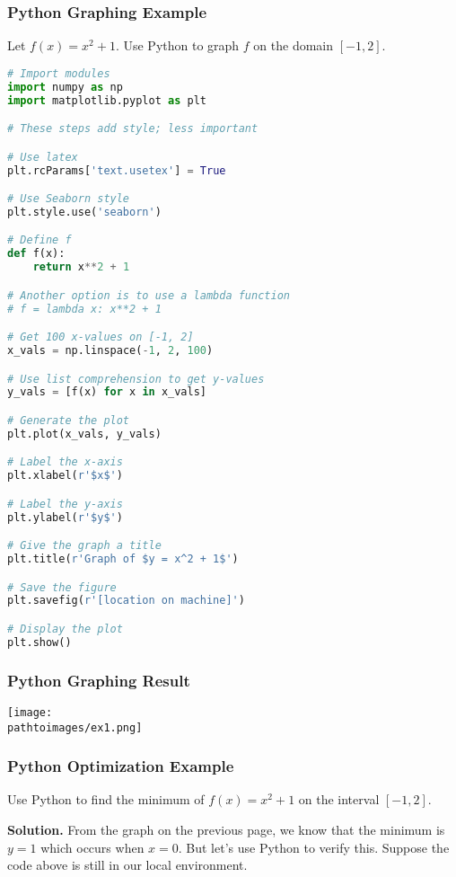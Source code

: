 \documentclass{beamer}
\newcommand{\pathtoimages}{/Users/charlesrambo/Desktop/Bootcamp24/Images}
\begin{document}
\begin{frame}[fragile]
\frametitle{Python Graphing Example}

\begin{example} 
Let $f(x) = x^2 + 1$. Use Python to graph $f$ on the domain $[-1, 2]$.
\end{example}

\begin{multicols}{2}
\begin{lstlisting}[language=Python]
# Import modules 
import numpy as np
import matplotlib.pyplot as plt

# These steps add style; less important

# Use latex
plt.rcParams['text.usetex'] = True

# Use Seaborn style
plt.style.use('seaborn')

# Define f
def f(x):
    return x**2 + 1

# Another option is to use a lambda function
# f = lambda x: x**2 + 1

# Get 100 x-values on [-1, 2]
x_vals = np.linspace(-1, 2, 100)

# Use list comprehension to get y-values
y_vals = [f(x) for x in x_vals]

# Generate the plot
plt.plot(x_vals, y_vals)

# Label the x-axis
plt.xlabel(r'$x$')

# Label the y-axis
plt.ylabel(r'$y$')

# Give the graph a title
plt.title(r'Graph of $y = x^2 + 1$')

# Save the figure
plt.savefig(r'[location on machine]')

# Display the plot
plt.show()

\end{lstlisting}

\end{multicols}

\end{frame}

\begin{frame}
\frametitle{Python Graphing Result}
\begin{center}
\texttt{[image: \\pathtoimages/ex1.png]}
\end{center}
\end{frame}

\begin{frame}[fragile]
\frametitle{Python Optimization Example}
\begin{example}
Use Python to find the minimum of $f(x) = x^2 + 1$ on the interval $[-1, 2]$.
\end{example}

{\bf Solution.} From the graph on the previous page, we know that the minimum is $y = 1$ which occurs when $x = 0$. But let's use Python to verify this. Suppose the code above is still in our local environment. 

\end{frame}
\end{document}
